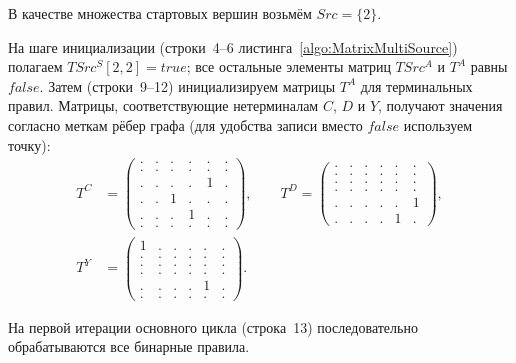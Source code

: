 В качестве множества стартовых вершин возьмём $\mathit{Src} = \{2\}$.

На шаге инициализации (строки~4--6 листинга~\ref{algo:MatrixMultiSource}) полагаем $TSrc^S[2,2] = \mathit{true}$; все остальные элементы матриц $TSrc^A$ и $T^A$ равны $\mathit{false}$.
Затем (строки~9--12) инициализируем матрицы $T^A$ для терминальных правил.
Матрицы, соответствующие нетерминалам $C$, $D$ и $Y$, получают значения согласно меткам рёбер графа (для удобства записи вместо $\mathit{false}$ используем точку):
{
    \renewcommand{\arraystretch}{0.7}
    \setlength\arraycolsep{2pt}
\begin{align*}
    T^C &=
    \begin{pmatrix}
    . & . & . & . & . & . \\
    . & . & . & . & . & . \\
    . & . & . & . & 1 & . \\
    . & . & 1 & . & . & . \\
    . & . & . & 1 & . & . \\
    . & . & . & . & . & .
    \end{pmatrix},
    \qquad
    T^D =
    \begin{pmatrix}
    . & . & . & . & . & . \\
    . & . & . & . & . & . \\
    . & . & . & . & . & . \\
    . & . & . & . & . & . \\
    . & . & . & . & . & 1 \\
    . & . & . & . & 1 & .
    \end{pmatrix},
    \\
    T^Y &=
    \begin{pmatrix}
    1 & . & . & . & . & . \\
    . & . & . & . & . & . \\
    . & . & . & . & . & . \\
    . & . & . & . & . & . \\
    . & . & . & . & 1 & . \\
    . & . & . & . & . & .
    \end{pmatrix}.
\end{align*}
}

На первой итерации основного цикла (строка~13) последовательно обрабатываются все бинарные правила.

